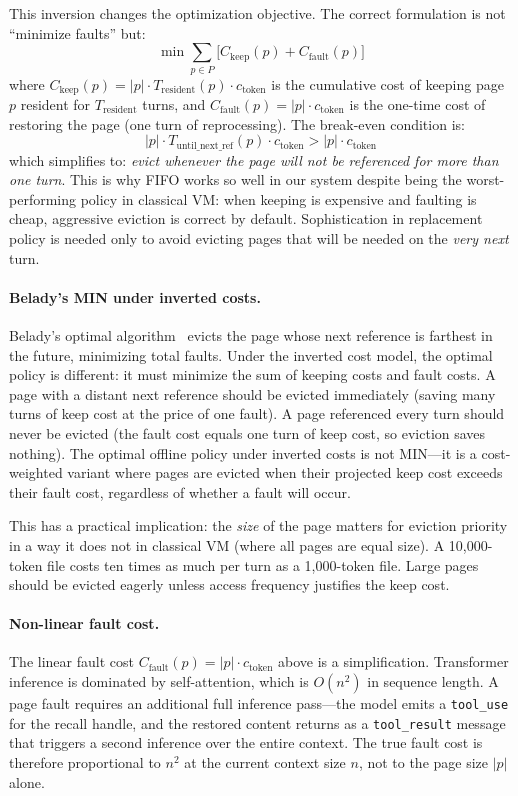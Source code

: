 This inversion changes the optimization objective. The correct
formulation is not ``minimize faults'' but:
\[
  \min \sum_{p \in P} \bigl[ C_{\text{keep}}(p) + C_{\text{fault}}(p) \bigr]
\]
where $C_{\text{keep}}(p) = |p| \cdot T_{\text{resident}}(p) \cdot
c_{\text{token}}$ is the cumulative cost of keeping page $p$ resident
for $T_{\text{resident}}$ turns, and $C_{\text{fault}}(p) = |p| \cdot
c_{\text{token}}$ is the one-time cost of restoring the page (one
turn of reprocessing). The break-even condition is:
\[
  |p| \cdot T_{\text{until\_next\_ref}}(p) \cdot c_{\text{token}} >
  |p| \cdot c_{\text{token}}
\]
which simplifies to: \emph{evict whenever the page will not be
referenced for more than one turn}. This is why FIFO works so well
in our system despite being the worst-performing policy in classical
VM: when keeping is expensive and faulting is cheap, aggressive
eviction is correct by default. Sophistication in replacement policy
is needed only to avoid evicting pages that will be needed on the
\emph{very next} turn.

\paragraph{Belady's MIN under inverted costs.}
Belady's optimal algorithm~\citep{belady1966study} evicts the page
whose next reference is farthest in the future, minimizing total
faults. Under the inverted cost model, the optimal policy is
different: it must minimize the sum of keeping costs and fault costs.
A page with a distant next reference should be evicted immediately
(saving many turns of keep cost at the price of one fault). A page
referenced every turn should never be evicted (the fault cost equals
one turn of keep cost, so eviction saves nothing). The optimal
offline policy under inverted costs is not MIN---it is a
cost-weighted variant where pages are evicted when their projected
keep cost exceeds their fault cost, regardless of whether a fault
will occur.

This has a practical implication: the \emph{size} of the page matters
for eviction priority in a way it does not in classical VM (where all
pages are equal size). A 10{,}000-token file costs ten times as much
per turn as a 1{,}000-token file. Large pages should be evicted
eagerly unless access frequency justifies the keep cost.

\paragraph{Non-linear fault cost.}
The linear fault cost $C_{\text{fault}}(p) = |p| \cdot c_{\text{token}}$
above is a simplification. Transformer inference is dominated by
self-attention, which is $O(n^2)$ in sequence length. A page fault
requires an additional full inference pass---the model emits a
\texttt{tool\_use} for the recall handle, and the restored content
returns as a \texttt{tool\_result} message that triggers a second
inference over the entire context. The true fault cost is therefore
proportional to $n^2$ at the current context size $n$, not to the
page size $|p|$ alone.

